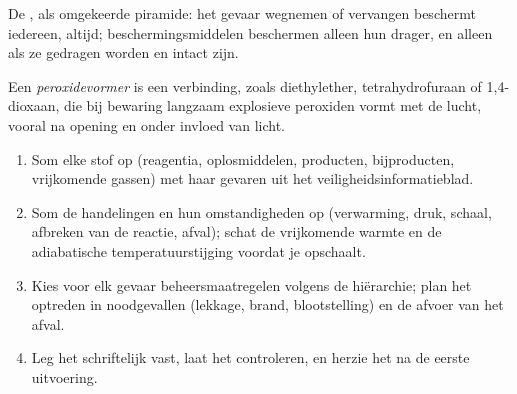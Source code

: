 \begin{omfigure}

{\small De , als omgekeerde piramide: het
gevaar wegnemen of vervangen beschermt iedereen, altijd;
beschermingsmiddelen beschermen alleen hun drager, en alleen als ze
gedragen worden en intact zijn.}
\end{omfigure}

\begin{definition}[Peroxidevormers]\label{def:b3:lab-techniques-3:peroxide}
Een \emph{peroxidevormer} is een verbinding, zoals
diethylether, tetrahydrofuraan of 1,4-dioxaan, die bij bewaring
langzaam explosieve peroxiden vormt met de lucht, vooral na opening en
onder invloed van licht.
\end{definition}

\begin{method}\label{met:b3:lab-techniques-3:risk-assessment}
\begin{enumerate}
  \item Som elke stof op (reagentia, oplosmiddelen, producten,
        bijproducten, vrijkomende gassen) met haar gevaren uit het
        veiligheidsinformatieblad.
  \item Som de handelingen en hun omstandigheden op (verwarming, druk,
        schaal, afbreken van de reactie, afval); schat de vrijkomende
        warmte en de adiabatische temperatuurstijging voordat je
        opschaalt.
  \item Kies voor elk gevaar beheersmaatregelen volgens de hiërarchie;
        plan het optreden in noodgevallen (lekkage, brand, blootstelling)
        en de afvoer van het afval.
  \item Leg het schriftelijk vast, laat het controleren, en herzie het na
        de eerste uitvoering.
\end{enumerate}
\end{method}

